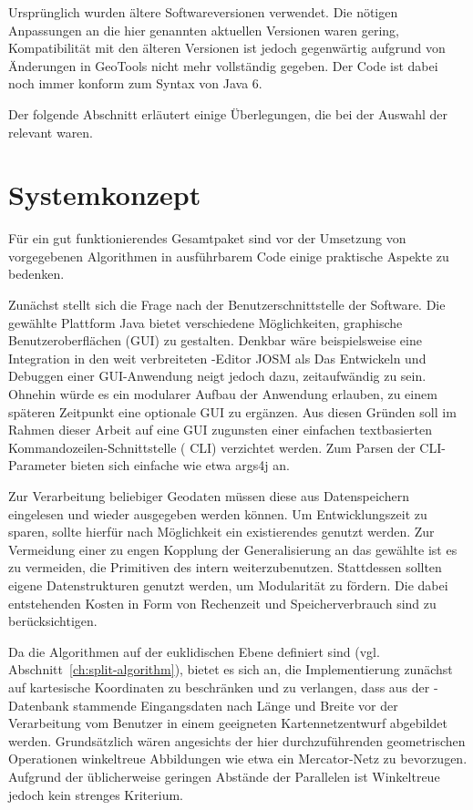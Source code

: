 \documentclass[../main/thesis.tex]{subfiles}
\begin{document}
Ursprünglich wurden ältere Softwareversionen verwendet.
Die nötigen Anpassungen an die hier genannten aktuellen Versionen waren gering, Kompatibilität mit den älteren Versionen ist jedoch gegenwärtig aufgrund von Änderungen in GeoTools nicht mehr vollständig gegeben.
Der Code ist dabei noch immer konform zum Syntax von Java 6. 

Der folgende Abschnitt erläutert einige Überlegungen, die bei der Auswahl der  relevant waren.



\section{Systemkonzept}

Für ein gut funktionierendes Gesamtpaket sind vor der Umsetzung von vorgegebenen Algorithmen in ausführbarem Code einige praktische Aspekte zu bedenken.

Zunächst stellt sich die Frage nach der Benutzerschnittstelle der Software.
Die gewählte Plattform Java bietet verschiedene Möglichkeiten, graphische Benutzeroberflächen (GUI) zu gestalten.
Denkbar wäre beispielsweise eine Integration in den weit verbreiteten \osm-Editor JOSM als 
Das Entwickeln und Debuggen einer GUI-Anwendung neigt jedoch dazu, zeitaufwändig zu sein.
Ohnehin würde es ein modularer Aufbau der Anwendung erlauben, zu einem späteren Zeitpunkt eine optionale GUI zu ergänzen.
Aus diesen Gründen soll im Rahmen dieser Arbeit auf eine GUI zugunsten einer einfachen textbasierten Kommandozeilen-Schnittstelle ( CLI) verzichtet werden.
Zum Parsen der CLI-Parameter bieten sich einfache  wie etwa args4j an.

Zur Verarbeitung beliebiger Geodaten müssen diese aus Datenspeichern eingelesen und wieder ausgegeben werden können.
Um Entwicklungszeit zu sparen, sollte hierfür nach Möglichkeit ein existierendes  genutzt werden.
Zur Vermeidung einer zu engen Kopplung der Generalisierung an das gewählte  ist es zu vermeiden, die Primitiven des  intern weiterzubenutzen.
Stattdessen sollten eigene Datenstrukturen genutzt werden, um Modularität zu fördern.
Die dabei entstehenden Kosten in Form von Rechenzeit und Speicherverbrauch sind zu berücksichtigen.

Da die Algorithmen auf der euklidischen Ebene definiert sind (vgl. Abschnitt~\ref{ch:split-algorithm}), bietet es sich an, die Implementierung zunächst auf kartesische Koordinaten zu beschränken und zu verlangen, dass aus der \osm-Datenbank stammende Eingangsdaten nach Länge und Breite vor der Verarbeitung vom Benutzer in einem geeigneten Kartennetzentwurf abgebildet werden.
Grundsätzlich wären angesichts der hier durchzuführenden geometrischen Operationen winkeltreue Abbildungen wie etwa ein Mercator-Netz zu bevorzugen.
Aufgrund der üblicherweise geringen Abstände der Parallelen ist Winkeltreue jedoch kein strenges Kriterium.
\end{document}

